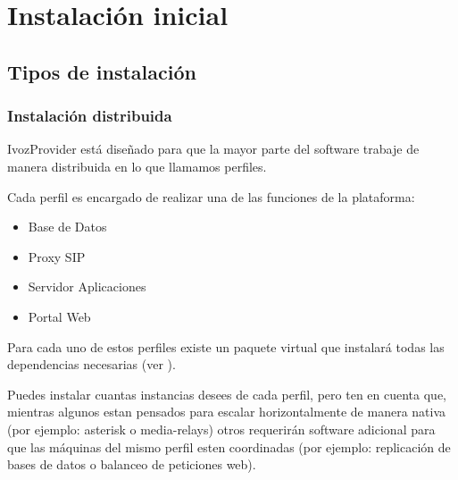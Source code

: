 \documentclass[letterpaper,10pt,spanish]{sphinxmanual}
\begin{document}
\chapter{Instalación inicial}
\label{basic_concepts/installation/index::doc}\label{basic_concepts/installation/index:initial-installation}

\section{Tipos de instalación}
\label{basic_concepts/installation/install_types::doc}\label{basic_concepts/installation/install_types:installation-types}\label{basic_concepts/installation/install_types:distributed-install}

\subsection{Instalación distribuida}
\label{basic_concepts/installation/install_types:distributed-install}\label{basic_concepts/installation/install_types:instalacion-distribuida}\label{basic_concepts/installation/install_types:id1}
IvozProvider está diseñado para que la mayor parte del software trabaje de manera distribuida en lo que llamamos perfiles.

Cada perfil es encargado de realizar una de las funciones de la plataforma:
\begin{itemize}
\item {} 
Base de Datos

\item {} 
Proxy SIP

\item {} 
Servidor Aplicaciones

\item {} 
Portal Web

\end{itemize}

Para cada uno de estos perfiles existe un paquete virtual que instalará todas las dependencias necesarias (ver {\hyperref[basic_concepts/installation/debian_install:instalar\string-el\string-paquete\string-del\string-rol]{}}).

Puedes instalar cuantas instancias desees de cada perfil, pero ten en cuenta que, mientras algunos estan pensados para escalar horizontalmente de manera nativa (por ejemplo: asterisk o media-relays) otros requerirán software adicional para que las máquinas del mismo perfil esten coordinadas (por ejemplo: replicación de bases de datos o balanceo de peticiones web).
\label{basic_concepts/installation/install_types:standalone-install}
\end{document}
